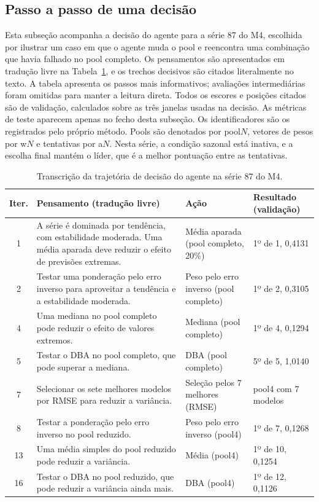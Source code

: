 \subsection{Passo a passo de uma decisão} \label{subsec:transcricao-decisao}

Esta subseção acompanha a decisão do agente para a série 87 do M4, escolhida por ilustrar um caso em que o agente muda o pool e reencontra uma combinação que havia falhado no pool completo. Os pensamentos são apresentados em tradução livre na Tabela~\ref{tab:transcricao-decisao}, e os trechos decisivos são citados literalmente no texto. A tabela apresenta os passos mais informativos; avaliações intermediárias foram omitidas para manter a leitura direta. Todos os escores e posições citados são de validação, calculados sobre as três janelas usadas na decisão. As métricas de teste aparecem apenas no fecho desta subseção. Os identificadores são os registrados pelo próprio método. Pools são denotados por pool$N$, vetores de pesos por w$N$ e tentativas por a$N$. Nesta série, a condição sazonal está inativa, e a escolha final mantém o líder, que é a melhor pontuação entre as tentativas.

\begin{table}[H]
\centering
\caption{Transcrição da trajetória de decisão do agente na série 87 do M4.}
\label{tab:transcricao-decisao}
\footnotesize
\begin{tabular}{@{}cp{6.2cm}p{3.8cm}p{3.2cm}@{}}
\toprule
\textbf{Iter.} & \textbf{Pensamento (tradução livre)} & \textbf{Ação} & \textbf{Resultado (validação)} \\
\midrule
1 & A série é dominada por tendência, com estabilidade moderada. Uma média aparada deve reduzir o efeito de previsões extremas. & Média aparada (pool completo, 20\%) & 1º de 1, 0,4131 \\
2 & Testar uma ponderação pelo erro inverso para aproveitar a tendência e a estabilidade moderada. & Peso pelo erro inverso (pool completo) & 1º de 2, 0,3105 \\
4 & Uma mediana no pool completo pode reduzir o efeito de valores extremos. & Mediana (pool completo) & 1º de 4, 0,1294 \\
5 & Testar o DBA no pool completo, que pode superar a mediana. & DBA (pool completo) & 5º de 5, 1,0140 \\
7 & Selecionar os sete melhores modelos por RMSE para reduzir a variância. & Seleção pelos 7 melhores (RMSE) & pool4 com 7 modelos \\
8 & Testar a ponderação pelo erro inverso no pool reduzido. & Peso pelo erro inverso (pool4) & 1º de 7, 0,1268 \\
13 & Uma média simples do pool reduzido pode reduzir a variância. & Média (pool4) & 1º de 10, 0,1254 \\
16 & Testar o DBA no pool reduzido, que pode reduzir a variância ainda mais. & DBA (pool4) & 1º de 12, 0,1126 \\
\bottomrule
\end{tabular}
\end{table}

